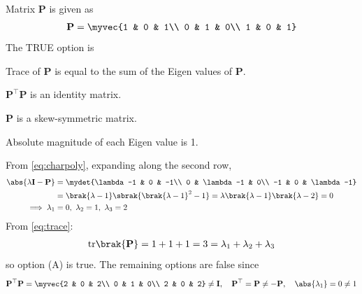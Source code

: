\begin{enumerate}[label=1.2.\arabic*,leftmargin=*,labelsep=0.8em,itemsep=2ex]
\problem Matrix $\mathbf{P}$ is given as
\begin{align}
\mathbf{P} = \myvec{1 & 0 & 1\\ 0 & 1 & 0\\ 1 & 0 & 1}
\end{align}
The TRUE option is \gate
\begin{options}
\item Trace of $\mathbf{P}$ is equal to the sum of the Eigen values of $\mathbf{P}$.
\item $\mathbf{P}^\top\mathbf{P}$ is an identity matrix.
\item $\mathbf{P}$ is a skew-symmetric matrix.
\item Absolute magnitude of each Eigen value is 1.
\end{options}
\solution From \eqref{eq:charpoly}, expanding along the second row,
\begin{align}
\abs{\lambda\mathbf{I} - \mathbf{P}} &= \mydet{\lambda-1 & 0 & -1\\ 0 & \lambda-1 & 0\\ -1 & 0 & \lambda-1}\\
&= \brak{\lambda-1}\sbrak{\brak{\lambda-1}^2 - 1} = \lambda\brak{\lambda-1}\brak{\lambda-2} = 0\\
\implies \lambda_1 &= 0,\ \lambda_2 = 1,\ \lambda_3 = 2
\end{align}
From \eqref{eq:trace}:
\begin{align}
\text{tr}\brak{\mathbf{P}} = 1+1+1 = 3 = \lambda_1 + \lambda_2 + \lambda_3
\end{align}
so option (A) is true. The remaining options are false since
\begin{align}
\mathbf{P}^\top\mathbf{P} = \myvec{2 & 0 & 2\\ 0 & 1 & 0\\ 2 & 0 & 2} \neq \mathbf{I},\quad \mathbf{P}^\top = \mathbf{P} \neq -\mathbf{P},\quad \abs{\lambda_1} = 0 \neq 1
\end{align}


\end{enumerate}
